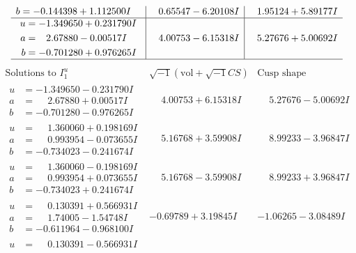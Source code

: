 \documentclass[1p]{elsarticle_modified}
\theoremstyle{definition}
\newcommand{\I}{\sqrt{-1}}
\begin{document}
$$\begin{array}{c|c|c}
\begin{aligned}
b &= -0.144398 + 1.112500 I\end{aligned}
 & \phantom{-}0.65547 - 6.20108 I & \phantom{-}1.95124 + 5.89177 I \\ \hline\begin{aligned}
u &= -1.349650 + 0.231790 I \\
a &= \phantom{-}2.67880 - 0.00517 I \\
b &= -0.701280 + 0.976265 I\end{aligned}
 & \phantom{-}4.00753 - 6.15318 I & \phantom{-}5.27676 + 5.00692 I\\
 \hline 
 \end{array}$$\newpage$$\begin{array}{c|c|c}  
\text{Solutions to }I^u_{1}& \I (\text{vol} + \sqrt{-1}CS) & \text{Cusp shape}\\
 \hline 
\begin{aligned}
u &= -1.349650 - 0.231790 I \\
a &= \phantom{-}2.67880 + 0.00517 I \\
b &= -0.701280 - 0.976265 I\end{aligned}
 & \phantom{-}4.00753 + 6.15318 I & \phantom{-}5.27676 - 5.00692 I \\ \hline\begin{aligned}
u &= \phantom{-}1.360060 + 0.198169 I \\
a &= \phantom{-}0.993954 - 0.073655 I \\
b &= -0.734023 - 0.241674 I\end{aligned}
 & \phantom{-}5.16768 + 3.59908 I & \phantom{-}8.99233 - 3.96847 I \\ \hline\begin{aligned}
u &= \phantom{-}1.360060 - 0.198169 I \\
a &= \phantom{-}0.993954 + 0.073655 I \\
b &= -0.734023 + 0.241674 I\end{aligned}
 & \phantom{-}5.16768 - 3.59908 I & \phantom{-}8.99233 + 3.96847 I \\ \hline\begin{aligned}
u &= \phantom{-}0.130391 + 0.566931 I \\
a &= \phantom{-}1.74005 - 1.54748 I \\
b &= -0.611964 - 0.968100 I\end{aligned}
 & -0.69789 + 3.19845 I & -1.06265 - 3.08489 I \\ \hline\begin{aligned}
u &= \phantom{-}0.130391 - 0.566931 I \\

\end{aligned}
\end{array}$$
\end{document}
